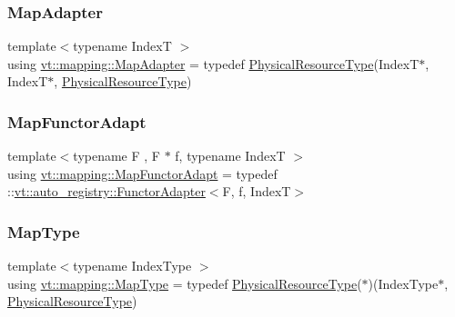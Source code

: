 \subsubsection{\texorpdfstring{Map\+Adapter}{MapAdapter}}
{\footnotesize\ttfamily template$<$typename IndexT $>$ \\
using \hyperlink{namespacevt_1_1mapping_a41b113c28bb6430fbcb5be66e08ccf9f}{vt\+::mapping\+::\+Map\+Adapter} = typedef \hyperlink{namespacevt_a2dc36fcada816dc6d11774d650328ee9}{Physical\+Resource\+Type}(IndexT$\ast$, IndexT$\ast$, \hyperlink{namespacevt_a2dc36fcada816dc6d11774d650328ee9}{Physical\+Resource\+Type})}

\mbox{\label{namespacevt_1_1mapping_add4b5257a62b56d194f7e931b608f8f0}} 
\subsubsection{\texorpdfstring{Map\+Functor\+Adapt}{MapFunctorAdapt}}
{\footnotesize\ttfamily template$<$typename F , F $\ast$ f, typename IndexT $>$ \\
using \hyperlink{namespacevt_1_1mapping_add4b5257a62b56d194f7e931b608f8f0}{vt\+::mapping\+::\+Map\+Functor\+Adapt} = typedef \+::\hyperlink{structvt_1_1auto__registry_1_1_functor_adapter}{vt\+::auto\+\_\+registry\+::\+Functor\+Adapter}$<$F, f, IndexT$>$}

\mbox{\label{namespacevt_1_1mapping_a443f8bb8920af5ae1d3391f61fe492a6}} 
\subsubsection{\texorpdfstring{Map\+Type}{MapType}}
{\footnotesize\ttfamily template$<$typename Index\+Type $>$ \\
using \hyperlink{namespacevt_1_1mapping_a443f8bb8920af5ae1d3391f61fe492a6}{vt\+::mapping\+::\+Map\+Type} = typedef \hyperlink{namespacevt_a2dc36fcada816dc6d11774d650328ee9}{Physical\+Resource\+Type}($\ast$)(Index\+Type$\ast$, \hyperlink{namespacevt_a2dc36fcada816dc6d11774d650328ee9}{Physical\+Resource\+Type})}

\mbox{\label{namespacevt_1_1mapping_a8dbe779cb3e28ed8c424bcc8826765b9}} 
